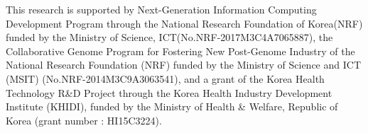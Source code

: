\documentclass{article}
\begin{document}
This research is supported by Next-Generation Information Computing Development Program through the National Research Foundation of Korea(NRF) funded by the Ministry of Science, ICT(No.NRF-2017M3C4A7065887),
the Collaborative Genome Program for Fostering New Post-Genome Industry of the National Research Foundation (NRF) funded by the Ministry of Science and ICT (MSIT) (No.NRF-2014M3C9A3063541),
and a grant of the Korea Health Technology R\&D Project through the Korea Health Industry Development Institute (KHIDI), funded by the Ministry of Health \& Welfare, Republic of Korea (grant number : HI15C3224).



\end{document}
